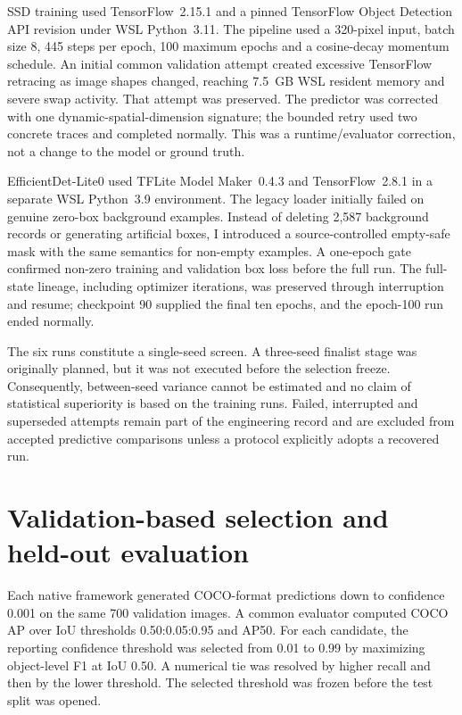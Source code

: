 SSD training used TensorFlow~2.15.1 and a pinned TensorFlow Object Detection
API revision under WSL Python~3.11. The pipeline used a 320-pixel input,
batch size 8, 445 steps per epoch, 100 maximum epochs and a cosine-decay
momentum schedule. An initial common validation attempt created excessive
TensorFlow retracing as image shapes changed, reaching 7.5~GB WSL resident
memory and severe swap activity. That attempt was preserved. The predictor was
corrected with one dynamic-spatial-dimension signature; the bounded retry used
two concrete traces and completed normally. This was a runtime/evaluator
correction, not a change to the model or ground truth.

EfficientDet-Lite0 used TFLite Model Maker~0.4.3 and TensorFlow~2.8.1 in a
separate WSL Python~3.9 environment. The legacy loader initially failed on
genuine zero-box background examples. Instead of deleting 2,587 background
records or generating artificial boxes, I introduced a source-controlled
empty-safe mask with the same semantics for non-empty examples. A one-epoch
gate confirmed non-zero training and validation box loss before the full run.
The full-state lineage, including optimizer iterations, was preserved through
interruption and resume; checkpoint 90 supplied the final ten epochs, and the
epoch-100 run ended normally.

The six runs constitute a single-seed screen. A three-seed finalist stage was
originally planned, but it was not executed before the selection freeze.
Consequently, between-seed variance cannot be estimated and no claim of
statistical superiority is based on the training runs. Failed, interrupted and
superseded attempts remain part of the engineering record and are excluded
from accepted predictive comparisons unless a protocol explicitly adopts a
recovered run.

\section{Validation-based selection and held-out evaluation}
\label{sec:data-models:5}

Each native framework generated COCO-format predictions down to confidence
0.001 on the same 700 validation images. A common evaluator computed COCO AP
over IoU thresholds 0.50:0.05:0.95 and AP50. For each candidate, the reporting
confidence threshold was selected from 0.01 to 0.99 by maximizing object-level
F1 at IoU 0.50. A numerical tie was resolved by higher recall and then by the
lower threshold. The selected threshold was frozen before the test split was
opened.

